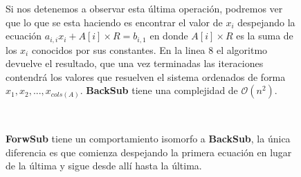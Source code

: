 \begin{figure}[!htb]
Si nos detenemos a observar esta \'ultima operaci\'on, podremos ver que lo que se esta haciendo es encontrar el valor de $x_i$ despejando la ecuaci\'on $a_{i,i}x_i + A[i] \times R = b_{i,1}$ en donde $A[i] \times R$ es la suma de los $x_i$ conocidos por sus constantes. En la linea 8 el algoritmo devuelve el resultado, que una vez terminadas las iteraciones contendr\'a los valores que resuelven el sistema ordenados de forma $x_1, x_2, ..., x_{cols(A)}$. \textbf{BackSub} tiene una complejidad de $\mathcal{O}(n^2)$.

~

\textbf{ForwSub} tiene un comportamiento isomorfo a \textbf{BackSub}, la \'unica diferencia es que comienza despejando la primera ecuaci\'on en lugar de la \'ultima y sigue desde all\'i hasta la \'ultima. 


\endminipage\hfill
\end{figure}

